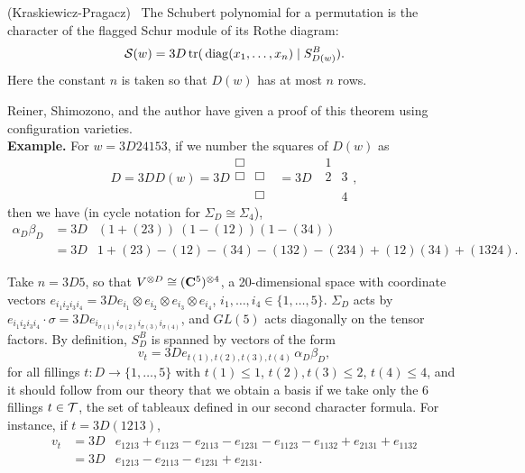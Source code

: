 \begin{thm}{(Kraskiewicz-Pragacz)\ }
\label{KP}
The Schubert polynomial for a permutation
is the character of the flagged Schur module
of its Rothe diagram:
$$
{\cal S}(w) =3D
\mathop{\rm tr}(\, \mathop{\rm diag}(x_1,\ldots,x_n) \mid S_{D(w)}^B).
$$
Here the constant $n$ is taken so that $D(w)$ has at
most $n$ rows.
\end{thm}
Reiner, Shimozono, and the author have given a proof
of this theorem using configuration varieties.
\\[.5em]
{\bf Example.}  For $w =3D 24153$, if we
number the squares of $D(w)$ as
$$
D =3D D(w) =3D
\begin{array}{cc}
 \Box &      \\
 \Box & \Box \\
      &      \\
      & \Box
\end{array}
\ \ \
=3D
\ \ \
\begin{array}{cc}
  1   &      \\
  2   &  3   \\
      &      \\
      &  4
\end{array}
,
$$
then we have
(in cycle notation for $\Sigma_D \cong \Sigma_4$),
$$
\begin{array}{rcl}
\alpha_D \beta_D & =3D &
 (1 + (23)) \ (1-(12))(1-(34)) \\
& =3D &
1 + (23) - (12) - (34)
- (132) - (234) + (12)(34) + (1324) .
\end{array}
$$

Take $n =3D 5$,
so that $V^{\otimes D} \cong ({\bf C}^5)^{\otimes 4}$,
a 20-dimensional space with coordinate vectors
$e_{i_1 i_2 i_3 i_4} =3D
e_{i_1} \otimes e_{i_2} \otimes e_{i_3} \otimes e_{i_4}$,
$i_1, \ldots, i_4 \in \{1,\ldots,5\}$.
$\Sigma_D$ acts by
$e_{i_1 i_2 i_3 i_4} \cdot \sigma =3D
e_{i_{\sigma(1)} i_{\sigma(2)} i_{\sigma(3)} i_{\sigma(4)}}$,
and $GL(5)$ acts diagonally on the tensor factors.
By definition, $S_D^B$ is spanned by vectors of the form
$$
v_t =3D e_{t(1), t(2), t(3), t(4)}
\, \alpha_D \beta_D ,
$$
for all fillings $t  : D \rightarrow \{1,\ldots,5\}$
with $t(1) \leq 1$, $t(2),t(3) \leq 2$,
$t(4)\leq 4$, and
it should follow from our theory that we obtain a basis if
we take only the 6 fillings $t \in {\cal T}$, the set of tableaux
defined in our second character formula.
For instance, if $t =3D (1213)$,
$$
\begin{array}{rcl}
v_t & =3D  & e_{1213} + e_{1123} - e_{2113} - e_{1231}
- e_{1123} - e_{1132} + e_{2131} + e_{1132} \\
& =3D & e_{1213} - e_{2113} - e_{1231} + e_{2131}.
\end{array}
$$


